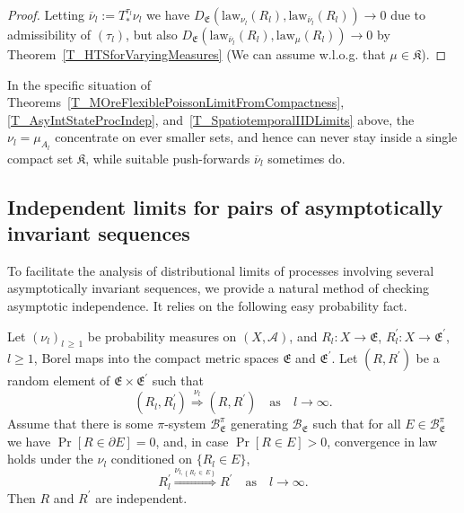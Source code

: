 \documentclass[AHL,Unicode,longabstracts]{cedram}
\newcommand{\clA}{\mathcal{A}}
\newcommand{\clB}{\mathcal{B}}
\newcommand{\law}{\mathrm{law}}
\newcommand{\frkK}{\mathfrak{K}}
\newcommand{\frkE}{\mathfrak{E}}
\begin{document}
\begin{proof}
Letting $\overline{\nu}_{l}:=T_{\ast}^{\tau_{l}}\nu_{l}$ we have $D_{\frkE}(\law_{\nu_{l}}(R_{l}),\law_{\overline{\nu }_{l}}(R_{l}))\rightarrow0$ due to admissibility of $(\tau_{l})$, but also $D_{\frkE}(\law_{\overline{\nu}_{l}}(R_{l}),\law_{\mu }(R_{l}))\rightarrow0$ by Theorem~\ref{T_HTSforVaryingMeasures} (We can assume w.l.o.g. that $\mu\in\frkK$).
\end{proof}



In the specific situation of Theorems~\ref{T_MOreFlexiblePoissonLimitFromCompactness}, \ref{T_AsyIntStateProcIndep}, and~\ref{T_SpatiotemporalIIDLimits} above, the $\nu_{l}=\mu_{A_{l}}$ concentrate on ever smaller sets, and hence can never stay inside a single compact set $\frkK$, while suitable push-forwards $\overline{\nu}_{l} $ sometimes do.


\subsection{Independent limits for pairs of asymptotically invariant sequences}
To facilitate the analysis of distributional limits of processes involving several asymptotically invariant sequences, we provide a natural method of checking asymptotic independence. It relies on the following easy probability fact.

\begin{lemm}\label{L_IndependentLimitPair}
Let $(\nu_{l})_{l\,\geq\,1}$ be probability measures on $(X,\clA)$, and $R_{l}:X\rightarrow\frkE$, $R_{l}^{\prime }:X\rightarrow\frkE^{\prime}$, $l\geq1$, Borel maps into the compact metric spaces $\frkE$ and $\frkE^{\prime}$. Let $(R,R^{\prime})$ be a random element of $\frkE\times\frkE^{\prime}$ such that
\begin{equation}\label{Eq_hdgsvczwetv}
\left(R_{l},R_{l}^{\prime}\right)\overset{\nu_{l}}{\Longrightarrow}\left(R,R^{\prime}\right)\quad\text{as}\quad l\rightarrow\infty\text{.} 
\end{equation}
Assume that there is some $\pi$-system $\clB_{\frkE}^{\pi}$ generating $\clB_{\frkE}$ such that for all $E\in\clB _{\frkE}^{\pi}$ we have $\Pr[R\in\partial E]=0$, and, in case $\Pr[R\in E]>0$, convergence in law holds under the $\nu_{l}$ conditioned on $\{R_{l}\in E\}$,
\begin{equation}\label{Eq_utioioio}
R_{l}^{\prime}\overset{\nu_{l,\left\{R_{l}\,\in\,E\right\}}}{\Longrightarrow}R^{\prime }\quad\text{as}\quad l\rightarrow\infty . 
\end{equation}
Then $R$ and $R^{\prime}$ are independent.
\end{lemm}
\end{document}
